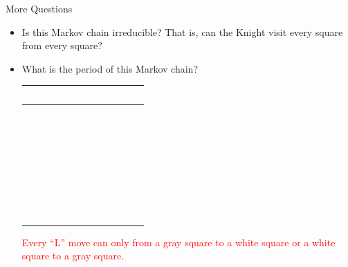 \documentclass[letterpaper, mathserif]{beamer}
\begin{document}
\begin{frame}{More Questions}
\begin{itemize}
\item Is this Markov chain irreducible? That is, can the Knight visit every square from every square?\bigskip
\item What is the period of this Markov chain?\pause

\begin{flushleft}
\begin{tabular}{|c|c|c|c|c|c|c|c|}\hline
\cellcolor{gray}~ & ~ & \cellcolor{gray}~ & ~ & \cellcolor{gray}~ & ~ & \cellcolor{gray}~ & ~ \\\hline
~ & \cellcolor{gray}~ & ~ & \cellcolor{gray}~ & ~ & \cellcolor{gray}~ & ~ & \cellcolor{gray}~ \\\hline
\cellcolor{gray}~ & ~ & \cellcolor{gray}~ & ~ & \cellcolor{gray}~ & ~ & \cellcolor{gray}~ & ~ \\\hline
~ & \cellcolor{gray}~ & ~ & \cellcolor{gray}~ & ~ & \cellcolor{gray}~ & ~ & \cellcolor{gray}~ \\\hline
\cellcolor{gray}~ & ~ & \cellcolor{gray}~ & ~ & \cellcolor{gray}~ & ~ & \cellcolor{gray}~ & ~ \\\hline
~ & \cellcolor{gray}~ & ~ & \cellcolor{gray}~ & ~ & \cellcolor{gray}~ & ~ & \cellcolor{gray}~ \\\hline
\cellcolor{gray}~ & ~ & \cellcolor{gray}~ & ~ & \cellcolor{gray}~ & ~ & \cellcolor{gray}~ & ~ \\\hline
~ & \cellcolor{gray}~ & ~ & \cellcolor{gray}~ & ~ & \cellcolor{gray}~ & ~ & \cellcolor{gray}~\\\hline
\end{tabular}
\end{flushleft}
\pause


\textcolor{red}{Every ``L'' move can only from a gray square to a white square or a white square to a gray square.}

\end{itemize}
\end{frame}
\end{document}

